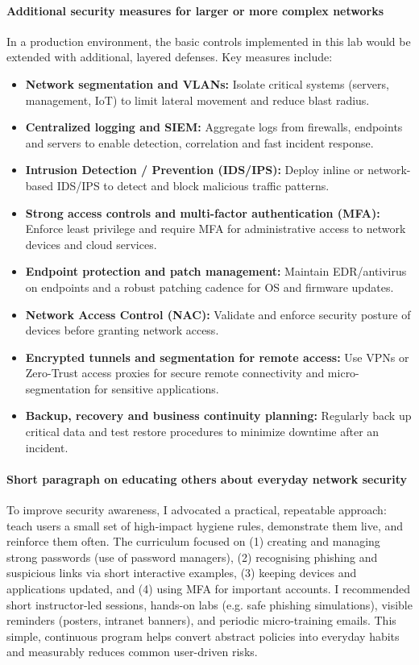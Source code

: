\documentclass[12pt,a4paper]{report}
\begin{document}
\paragraph{Additional security measures for larger or more complex networks}
In a production environment, the basic controls implemented in this lab would be extended with additional, layered defenses. Key measures include:
\begin{itemize}
  \item \textbf{Network segmentation and VLANs:} Isolate critical systems (servers, management, IoT) to limit lateral movement and reduce blast radius.
  \item \textbf{Centralized logging and SIEM:} Aggregate logs from firewalls, endpoints and servers to enable detection, correlation and fast incident response.
  \item \textbf{Intrusion Detection / Prevention (IDS/IPS):} Deploy inline or network-based IDS/IPS to detect and block malicious traffic patterns.
  \item \textbf{Strong access controls and multi-factor authentication (MFA):} Enforce least privilege and require MFA for administrative access to network devices and cloud services.
  \item \textbf{Endpoint protection and patch management:} Maintain EDR/antivirus on endpoints and a robust patching cadence for OS and firmware updates.
  \item \textbf{Network Access Control (NAC):} Validate and enforce security posture of devices before granting network access.
  \item \textbf{Encrypted tunnels and segmentation for remote access:} Use VPNs or Zero-Trust access proxies for secure remote connectivity and micro-segmentation for sensitive applications.
  \item \textbf{Backup, recovery and business continuity planning:} Regularly back up critical data and test restore procedures to minimize downtime after an incident.
\end{itemize}

\paragraph{Short paragraph on educating others about everyday network security}
To improve security awareness, I advocated a practical, repeatable approach: teach users a small set of high-impact hygiene rules, demonstrate them live, and reinforce them often. The curriculum focused on (1) creating and managing strong passwords (use of password managers), (2) recognising phishing and suspicious links via short interactive examples, (3) keeping devices and applications updated, and (4) using MFA for important accounts. I recommended short instructor-led sessions, hands-on labs (e.g. safe phishing simulations), visible reminders (posters, intranet banners), and periodic micro-training emails. This simple, continuous program helps convert abstract policies into everyday habits and measurably reduces common user-driven risks.
\end{document}

